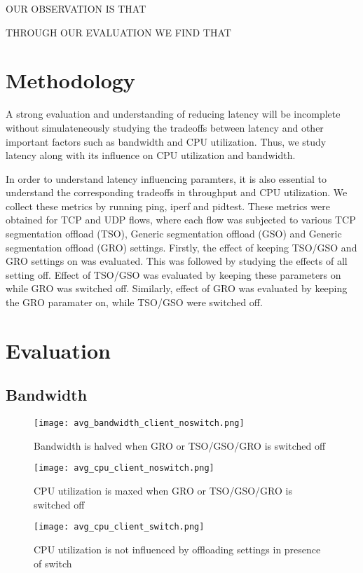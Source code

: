 OUR OBSERVATION IS THAT

THROUGH OUR EVALUATION WE FIND THAT

\section{Methodology}
A strong evaluation and understanding of reducing latency will be incomplete
without simulateneously studying the tradeoffs between latency and other
important factors such as bandwidth and CPU utilization. Thus, we study latency
along with its influence on CPU utilization and bandwidth. 

In order to understand latency influencing paramters, it is also essential to
understand the corresponding tradeoffs in throughput and CPU utilization. We
collect these metrics by running ping, iperf and pidtest. These metrics were
obtained for TCP and UDP flows, where each flow was subjected to various
TCP segmentation offload (TSO), Generic segmentation offload (GSO) and 
Generic segmentation offload (GRO) settings. Firstly, the effect of keeping
TSO/GSO and GRO settings on was evaluated. This was followed by studying the
effects of all setting off. Effect of TSO/GSO was evaluated by keeping these
parameters on while GRO was switched off. Similarly, effect of GRO was evaluated
by keeping the GRO paramater on, while TSO/GSO were switched off. 
 
\section{Evaluation}
\subsection{Bandwidth}
\begin{figure}[t] 
\texttt{[image: avg\_bandwidth\_client\_noswitch.png]}
\caption{Bandwidth is halved when GRO or TSO/GSO/GRO is switched off} 
\label{fig:avg_bandwidth_client_noswitch}
\end{figure}

\begin{figure}[t] 
\texttt{[image: avg\_cpu\_client\_noswitch.png]}
\caption{CPU utilization is maxed when GRO or TSO/GSO/GRO is switched off} 
\label{fig:avg_cpu_client_noswitch}
\end{figure}


\begin{figure}[t] 
\texttt{[image: avg\_cpu\_client\_switch.png]}
\caption{CPU utilization is not influenced by offloading settings 
in presence of switch} 
\label{fig:avg_cpu_client_switch}
\end{figure}


